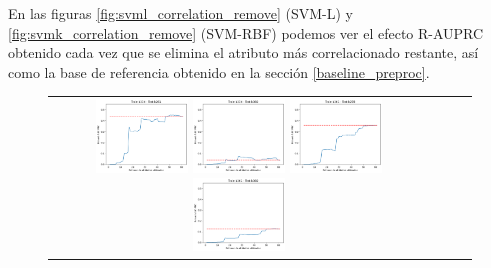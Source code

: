 En las figuras \ref{fig:svml_correlation_remove} (SVM-L) y \ref{fig:svmk_correlation_remove} (SVM-RBF) podemos ver el efecto R-AUPRC obtenido cada vez que se elimina el atributo más correlacionado restante, así como la base de referencia obtenido en la sección \ref{baseline_preproc}.

\begin{figure}[h!]
\begin{tabular}{cccc}
  \includegraphics[width=0.25\textwidth]{Kap6/pearson_linear_INDIVIDUAL_CURVES_train=b234test=b261}  \includegraphics[width=0.25\textwidth]{Kap6/pearson_linear_INDIVIDUAL_CURVES_train=b234test=b360}
  \includegraphics[width=0.25\textwidth]{Kap6/pearson_linear_INDIVIDUAL_CURVES_train=b261test=b278}  \includegraphics[width=0.25\textwidth]{Kap6/pearson_linear_INDIVIDUAL_CURVES_train=b261test=b360} \\


\end{tabular}
\end{figure}
